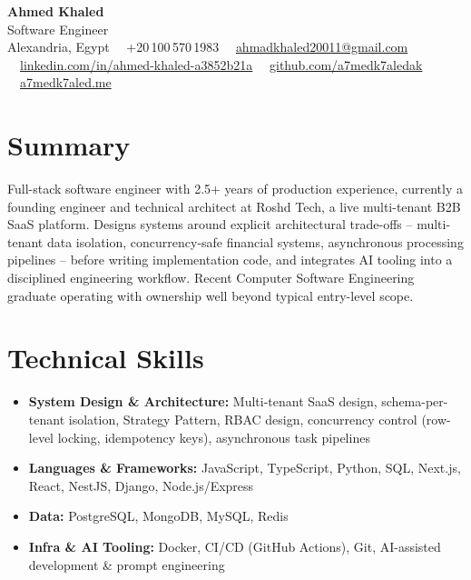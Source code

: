 \documentclass[10pt,letterpaper]{article}
\newcommand{\sectionrule}{\vspace{-1pt}{\color{hairline}\hrule height 0.6pt}\vspace{2pt}}
\begin{document}
\begin{center}
    {\fontsize{20}{22}\selectfont\textbf{Ahmed Khaled}}\\[1pt]
    {\color{accent}\fontsize{10}{11}\selectfont Software Engineer}\\[2pt]
    {\footnotesize\color{muted}
      Alexandria, Egypt \ \textperiodcentered\ +20\,100\,570\,1983 \ \textperiodcentered\
      \href{mailto:ahmadkhaled20011@gmail.com}{ahmadkhaled20011@gmail.com} \ \textperiodcentered\
      \href{https://www.linkedin.com/in/ahmed-khaled-a3852b21a/}{linkedin.com/in/ahmed-khaled-a3852b21a} \ \textperiodcentered\
      \href{https://github.com/a7medk7aledak}{github.com/a7medk7aledak} \ \textperiodcentered\
      \href{https://a7medk7aled.me}{a7medk7aled.me}
    }
\end{center}

\section*{Summary}
\sectionrule
{\small
Full-stack software engineer with 2.5+ years of production experience, currently a founding engineer and
technical architect at Roshd Tech, a live multi-tenant B2B SaaS platform. Designs systems around explicit
architectural trade-offs -- multi-tenant data isolation, concurrency-safe financial systems, asynchronous
processing pipelines -- before writing implementation code, and integrates AI tooling into a disciplined
engineering workflow. Recent Computer Software Engineering graduate operating with ownership well beyond
typical entry-level scope.
}

\section*{Technical Skills}
\sectionrule
{\small
\begin{itemize}
    \item \textbf{System Design \& Architecture:} Multi-tenant SaaS design, schema-per-tenant isolation, Strategy
    Pattern, RBAC design, concurrency control (row-level locking, idempotency keys), asynchronous task pipelines
    \item \textbf{Languages \& Frameworks:} JavaScript, TypeScript, Python, SQL, Next.js, React, NestJS, Django, Node.js/Express
    \item \textbf{Data:} PostgreSQL, MongoDB, MySQL, Redis
    \item \textbf{Infra \& AI Tooling:} Docker, CI/CD (GitHub Actions), Git, AI-assisted development \& prompt engineering
\end{itemize}
}
\end{document}
